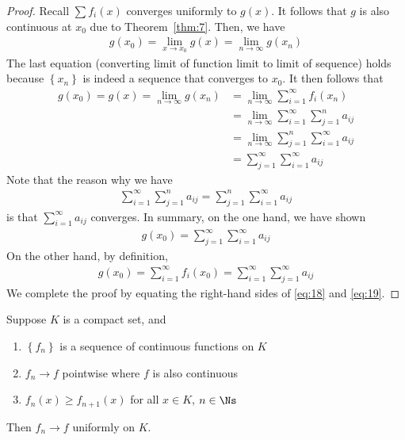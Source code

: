 \documentclass[thmcnt=section, 12pt]{elegantbook}
\begin{document}
\begin{proof}
    \par Recall $\sum f_i(x)$ converges uniformly to $g(x)$. It follows that $g$ is also continuous at $x_0$ due to Theorem~\ref{thm:7}. Then, we have
    \begin{align*}
        g(x_0) = \lim_{x \to x_0} g(x)
        = \lim_{n \to \infty} g(x_n)
    \end{align*}
    The last equation (converting limit of function limit to limit of sequence) holds because $\left\{x_n\right\}$ is indeed a sequence that converges to $x_0$. It then follows that 
    \begin{align*}
        g(x_0) = g(x)
        = \lim_{n \to \infty} g(x_n)
        &= \lim_{n \to \infty} \sum_{i=1}^\infty f_i(x_n) \\
        &= \lim_{n \to \infty} \sum_{i=1}^\infty \sum_{j=1}^n a_{ij} \\ 
        &= \lim_{n \to \infty} \sum_{j=1}^n \sum_{i=1}^\infty a_{ij} \\
        &= \sum_{j=1}^\infty \sum_{i=1}^\infty a_{ij}
    \end{align*}
    Note that the reason why we have 
    \begin{align*}
        \sum_{i=1}^\infty \sum_{j=1}^n a_{ij}
        = \sum_{j=1}^n \sum_{i=1}^\infty a_{ij}
    \end{align*}
    is that $\sum_{i=1}^\infty a_{ij}$ converges.
    In summary, on the one hand, we have shown 
    \begin{align}
        g(x_0) = \sum_{j=1}^\infty \sum_{i=1}^\infty a_{ij}
        \label{eq:18}
    \end{align}
    On the other hand, by definition, 
    \begin{align}
        g(x_0) = \sum_{i=1}^\infty f_i(x_0)
        = \sum_{i=1}^\infty \sum_{j=1}^\infty a_{ij}
        \label{eq:19}
    \end{align}
    We complete the proof by equating the right-hand sides of \eqref{eq:18} and \eqref{eq:19}.
\end{proof}


\begin{theorem}
    Suppose $K$ is a compact set, and 
    \begin{enumerate}
        \item $\left\{f_n\right\}$ is a sequence of continuous functions on $K$
        \item $f_n \to f$ pointwise where $f$ is also continuous
        \item $f_n(x) \geq f_{n+1}(x)$ for all $x \in K$, $n \in \Ns$
    \end{enumerate}
    Then $f_n \to f$ uniformly on $K$.
\end{theorem}
\end{document}
